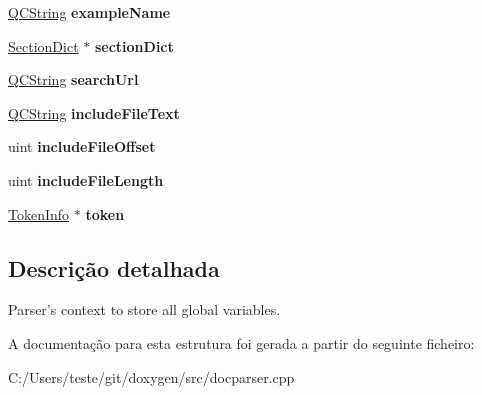 \begin{DoxyCompactItemize}
\item 
\hypertarget{struct_doc_parser_context_adac7c1fccd5f53fca6b718624417eeaf}{\hyperlink{class_q_c_string}{Q\-C\-String} {\bfseries example\-Name}}\label{struct_doc_parser_context_adac7c1fccd5f53fca6b718624417eeaf}

\item 
\hypertarget{struct_doc_parser_context_a4082a9dfe4e179a51276f333c4eac762}{\hyperlink{class_section_dict}{Section\-Dict} $\ast$ {\bfseries section\-Dict}}\label{struct_doc_parser_context_a4082a9dfe4e179a51276f333c4eac762}

\item 
\hypertarget{struct_doc_parser_context_a73ff32935591a81929780b705461c72a}{\hyperlink{class_q_c_string}{Q\-C\-String} {\bfseries search\-Url}}\label{struct_doc_parser_context_a73ff32935591a81929780b705461c72a}

\item 
\hypertarget{struct_doc_parser_context_a9bb775ad92fadab1d19f017e4fd0517e}{\hyperlink{class_q_c_string}{Q\-C\-String} {\bfseries include\-File\-Text}}\label{struct_doc_parser_context_a9bb775ad92fadab1d19f017e4fd0517e}

\item 
\hypertarget{struct_doc_parser_context_a983b30e2838bc40cfec82176314efcdc}{uint {\bfseries include\-File\-Offset}}\label{struct_doc_parser_context_a983b30e2838bc40cfec82176314efcdc}

\item 
\hypertarget{struct_doc_parser_context_abcb99604da9aa690b4dba02ebb5769b9}{uint {\bfseries include\-File\-Length}}\label{struct_doc_parser_context_abcb99604da9aa690b4dba02ebb5769b9}

\item 
\hypertarget{struct_doc_parser_context_a14742d8bac34e63074d9ac9a99289ab0}{\hyperlink{struct_token_info}{Token\-Info} $\ast$ {\bfseries token}}\label{struct_doc_parser_context_a14742d8bac34e63074d9ac9a99289ab0}

\end{DoxyCompactItemize}


\subsection{Descrição detalhada}
Parser's context to store all global variables. 

A documentação para esta estrutura foi gerada a partir do seguinte ficheiro\-:\begin{DoxyCompactItemize}
\item 
C\-:/\-Users/teste/git/doxygen/src/docparser.\-cpp\end{DoxyCompactItemize}
